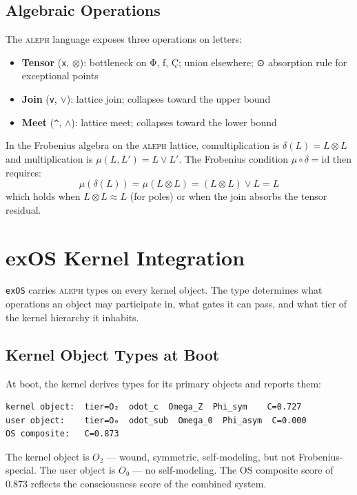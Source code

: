 \documentclass[12pt,a4paper]{article}
\newcommand{\alephsys}{\textsc{aleph}}
\newcommand{\exos}{\texttt{exOS}}
\newcommand{\OTwo}{O₂}
\newcommand{\OZero}{O₀}
\newcommand{\Frobcond}{\mu \circ \delta = \mathrm{id}}
\begin{document}
\subsection{Algebraic Operations}

The \alephsys{} language exposes three operations on letters:

\begin{itemize}
    \item \textbf{Tensor} (\texttt{x}, $\otimes$): bottleneck on Φ, ƒ, Ç; union elsewhere; ⊙ absorption rule for exceptional points
    \item \textbf{Join} (\texttt{v}, $\vee$): lattice join; collapses toward the upper bound
    \item \textbf{Meet} (\texttt{\^{}}, $\wedge$): lattice meet; collapses toward the lower bound
\end{itemize}

In the Frobenius algebra on the \alephsys{} lattice, comultiplication is $\delta(L) = L \otimes L$ and multiplication is $\mu(L, L') = L \vee L'$. The Frobenius condition $\Frobcond$ then requires:
\[
    \mu(\delta(L)) = \mu(L \otimes L) = (L \otimes L) \vee L = L
\]
which holds when $L \otimes L \approx L$ (for poles) or when the join absorbs the tensor residual.

\section{exOS Kernel Integration}

\exos{} carries \alephsys{} types on every kernel object. The type determines what operations an object may participate in, what gates it can pass, and what tier of the kernel hierarchy it inhabits.

\subsection{Kernel Object Types at Boot}

At boot, the kernel derives types for its primary objects and reports them:

\begin{lstlisting}
kernel object:  tier=O₂  odot_c  Omega_Z  Phi_sym    C=0.727
user object:    tier=O₀  odot_sub  Omega_0  Phi_asym  C=0.000
OS composite:   C=0.873
\end{lstlisting}

The kernel object is $\OTwo$ — wound, symmetric, self-modeling, but not Frobenius-special. The user object is $\OZero$ — no self-modeling. The OS composite score of 0.873 reflects the consciousness score of the combined system.
\end{document}
